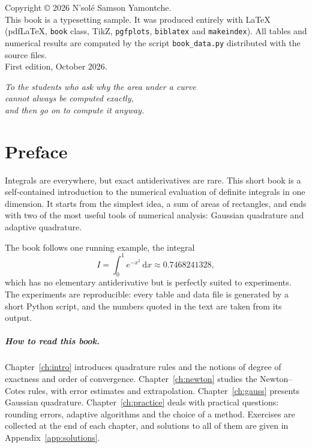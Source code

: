 \documentclass[11pt,a4paper,twoside,openright]{book}
\newcommand{\dd}{\,\mathrm{d}}
\begin{document}
\thispagestyle{empty}
\vspace*{\fill}
\begin{small}
\noindent Copyright \copyright{} 2026 N'sol\'e Samson Yamontche.\\[4pt]
This book is a typesetting sample. It was produced entirely with \LaTeX{} (pdf\LaTeX, \texttt{book} class, TikZ, \texttt{pgfplots}, \texttt{biblatex} and \texttt{makeindex}).
All tables and numerical results are computed by the script \texttt{book\_data.py} distributed with the source files.\\[4pt]
First edition, October 2026.
\end{small}
\cleardoublepage

\thispagestyle{empty}
\vspace*{0.25\textheight}
\begin{center}
  \itshape To the students who ask why the area under a curve\\ cannot always be computed exactly,\\ and then go on to compute it anyway.
\end{center}
\cleardoublepage

\pagestyle{fancy}
\chapter*{Preface}
Integrals are everywhere, but exact antiderivatives are rare.
This short book is a self-contained introduction to the numerical evaluation of definite integrals in one dimension.
It starts from the simplest idea, a sum of areas of rectangles, and ends with two of the most useful tools of numerical analysis: Gaussian quadrature and adaptive quadrature.

The book follows one running example, the integral
\[
  I=\int_0^1 e^{-x^{2}}\dd x\approx 0.7468241328,
\]
which has no elementary antiderivative but is perfectly suited to experiments.
The experiments are reproducible: every table and data file is generated by a short Python script, and the numbers quoted in the text are taken from its output.

\paragraph{How to read this book.}
Chapter~\ref{ch:intro} introduces quadrature rules and the notions of degree of exactness and order of convergence.
Chapter~\ref{ch:newton} studies the Newton--Cotes rules, with error estimates and extrapolation.
Chapter~\ref{ch:gauss} presents Gaussian quadrature.
Chapter~\ref{ch:practice} deals with practical questions: rounding errors, adaptive algorithms and the choice of a method.
Exercises are collected at the end of each chapter, and solutions to all of them are given in Appendix~\ref{app:solutions}.
\end{document}
